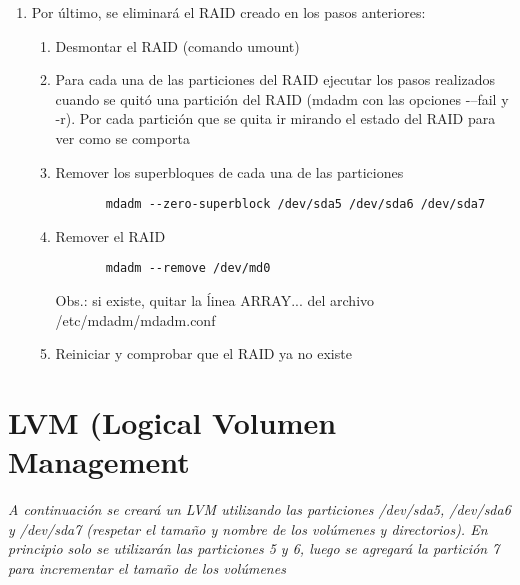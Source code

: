 \begin{enumerate}
 \item Por último, se eliminará el RAID creado en los pasos anteriores:
  \begin{enumerate}
   \item Desmontar el RAID (comando umount) 
   \item Para cada una de las particiones del RAID ejecutar los pasos realizados cuando se quitó una partición del RAID 
     (mdadm con las opciones -–fail y -r). Por cada partición que se quita ir mirando el estado del RAID para ver como se comporta         
   \item Remover los superbloques de cada una de las particiones
    \begin{verbatim} 
       mdadm --zero-superblock /dev/sda5 /dev/sda6 /dev/sda7
    \end{verbatim}
   \item Remover el RAID
    \begin{verbatim} 
       mdadm --remove /dev/md0 
    \end{verbatim}
   Obs.: si existe, quitar la ĺinea ARRAY... del archivo /etc/mdadm/mdadm.conf
   \item Reiniciar y comprobar que el RAID ya no existe
  \end{enumerate}
\end{enumerate}
     
\section{LVM (Logical Volumen Management}

\textit{A continuación se creará un LVM utilizando las particiones /dev/sda5, /dev/sda6 y /dev/sda7 (respetar el tamaño y nombre 
de los volúmenes y directorios). En principio solo se utilizarán las particiones 5 y 6, luego se agregará la partición 7 
para incrementar el tamaño de los volúmenes}
 

